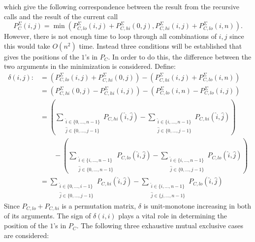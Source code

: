 \documentclass[twoside,11pt,openright]{report}
\begin{document}
which give the following correspondence between the result from the recursive calls and the result of the current call
\[
  P_C^{\Sigma}(i, j) = \min\left( P_{C,lo}^{\Sigma}(i, j) + P_{C,hi}^{\Sigma}(0, j),
                                  P_{C,hi}^{\Sigma}(i, j) + P_{C,lo}^{\Sigma}(i, n)
                            \right).
\]
However, there is not enough time to loop through all combinations of $i,j$ since this would take $O(n^2)$ time. Instead three conditions will be established that gives the positions of the $1$'s in $P_C$. In order to do this, the difference between the two arguments in the minimization is considered. Define:
\begin{align*}
  \delta(i, j) :&= \left( P_{C,lo}^{\Sigma}(i, j) + P_{C,hi}^{\Sigma}(0, j) \right) - \left( P_{C,hi}^{\Sigma}(i, j) + P_{C,lo}^{\Sigma}(i, n) \right) \\
    &= \left( P_{C,hi}^{\Sigma}(0, j) - P_{C,hi}^{\Sigma}(i, j) \right) - \left( P_{C,lo}^{\Sigma}(i, n) - P_{C,lo}^{\Sigma}(i, j) \right) \\
    &= \left( \sum_{\substack{\hat{i} \in \{0, \dots, n - 1\} \\ \hat{j} \in \{0, \dots, j - 1\}}} P_{C,hi}(\hat{i}, \hat{j}) - \sum_{\substack{\hat{i} \in \{i, \dots, n - 1\} \\ \hat{j} \in \{0, \dots, j - 1\}}} P_{C,hi}(\hat{i}, \hat{j}) \right) \\ &\quad\quad- \left( \sum_{\substack{\hat{i} \in \{i, \dots, n - 1\} \\ \hat{j} \in \{0, \dots, n - 1\}}} P_{C,lo}(\hat{i}, \hat{j}) - \sum_{\substack{\hat{i} \in \{i, \dots, n - 1\} \\ \hat{j} \in \{0, \dots, j - 1\}}} P_{C,lo}(\hat{i}, \hat{j}) \right) \\
    &= \sum_{\substack{\hat{i} \in \{0, \dots, i - 1\} \\ \hat{j} \in \{0, \dots, j - 1\}}} P_{C,hi}(\hat{i}, \hat{j}) - \sum_{\substack{\hat{i} \in \{i, \dots, n - 1\} \\ \hat{j} \in \{j, \dots, n - 1\}}} P_{C,lo}(\hat{i}, \hat{j})
\end{align*}
Since $P_{C,lo} + P_{C,hi}$ is a permutation matrix, $\delta$ is unit-monotone increasing in both of its arguments. The sign of $\delta(i, i)$ plays a vital role in determining the position of the $1$'s in $P_C$. The following three exhaustive mutual exclusive cases are considered:
\end{document}

